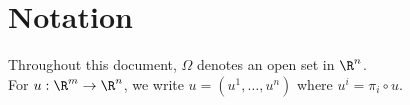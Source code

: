 \documentclass[../main.tex]{subfiles}
\begin{document}
\section{Notation}
Throughout this document, $ \Omega $ denotes an open set in $ \R^n $.\\
For $ u:\R^{m}\to\R^{n} $, we write $ u = (u^{1},\ldots, u^{n}) $ where $ u^{i} = \pi_{i}\circ u $.
\end{document}
